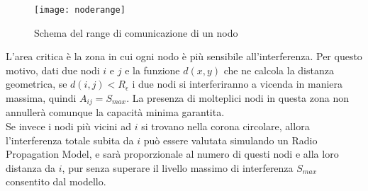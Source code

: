 %
\begin{figure}
	\begin{center}
		\texttt{[image: noderange]}
	\end{center}
	\caption{Schema del range di comunicazione di un nodo\label{fig:noderange}}
\end{figure}
%
L'area critica è la zona in cui ogni nodo è più sensibile all'interferenza. Per questo motivo, dati due nodi $i$ e $j$ e la funzione $d(x,y)$ che ne calcola la distanza geometrica, se $d(i,j) < R_\epsilon $ i due nodi si interferiranno a vicenda in maniera massima, quindi $A_{ij} = S_{max}$.
La presenza di molteplici nodi in questa zona non annullerà comunque la capacità minima garantita. \\
Se invece i nodi più vicini ad $i$ si trovano nella corona circolare, allora l'interferenza totale subita da $i$ può essere valutata simulando un Radio Propagation Model, e sarà proporzionale al numero di questi nodi e alla loro distanza da $i$, pur senza superare il livello massimo di interferenza $S_{max}$ consentito dal modello. 


